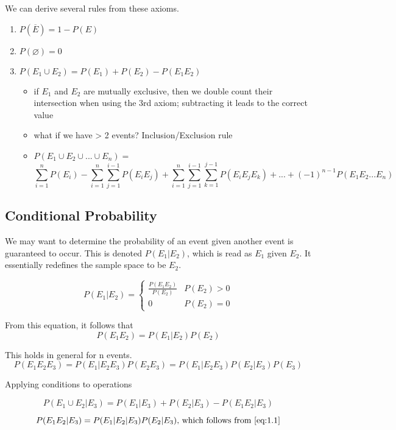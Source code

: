 We can derive several rules from these axioms.
\begin{enumerate}
    \item $P(\overline{E}) = 1 - P(E)$
    \item $P(\varnothing) = 0$
    \item $P(E_1 \cup E_2) = P(E_1) + P(E_2) - P(E_1E_2)$
    \begin{itemize}
        \item if $E_1$ and $E_2$ are mutually exclusive, then we double count their intersection when using the 3rd axiom; subtracting it leads to the correct value
        \item what if we have > 2 events? Inclusion/Exclusion rule 
        \item $P(E_1 \cup E_2 \cup ... \cup E_n) =$ \[
             \sum_{i=1}^{n}P(E_i) - \sum_{i=1}^{n}\sum_{j=1}^{i-1}P(E_iE_j) + \sum_{i=1}^{n}\sum_{j=1}^{i-1}\sum_{k=1}^{j-1}P(E_iE_jE_k) + ... + (-1)^{n-1}P(E_1E_2...E_n)
            \]
    \end{itemize}
\end{enumerate}

\pagebreak

\subsection*{Conditional Probability}
We may want to determine the probability of an event given another event is guaranteed to occur. This is denoted $P(E_1 | E_2)$, which is read as $E_1$ given $E_2$. It essentially redefines the sample space to be $E_2$.


\begin{equation} \label{eq:1.1}
    P(E_1 | E_2) = \begin{cases}
        \frac{P(E_1E_2)}{P(E_2)} & P(E_2) > 0 \\
        0 & P(E_2) = 0
    \end{cases}
\end{equation}

From this equation, it follows that
\[
    P(E_1E_2) = P(E_1 | E_2)P(E_2)
\]

This holds in general for n events.
\[
    P(E_1E_2E_3) = P(E_1 | E_2E_3)P(E_2E_3)
                 = P(E_1 | E_2E_3)P(E_ 2 | E_3)P(E_3)
\]

\begin{example}
    Applying conditions to operations

    \[
        P(E_1 \cup E_2 | E_3)  = P(E_1 | E_3) + P(E_2 | E_3) - P(E_1E_2 | E_3)
    \]

    \[
        P(E_1E_2 | E_3)  = P(E_1|E_2|E_3)P(E_2|E_3) \text{, which follows from \ref{eq:1.1}}
    \]
\end{example}

